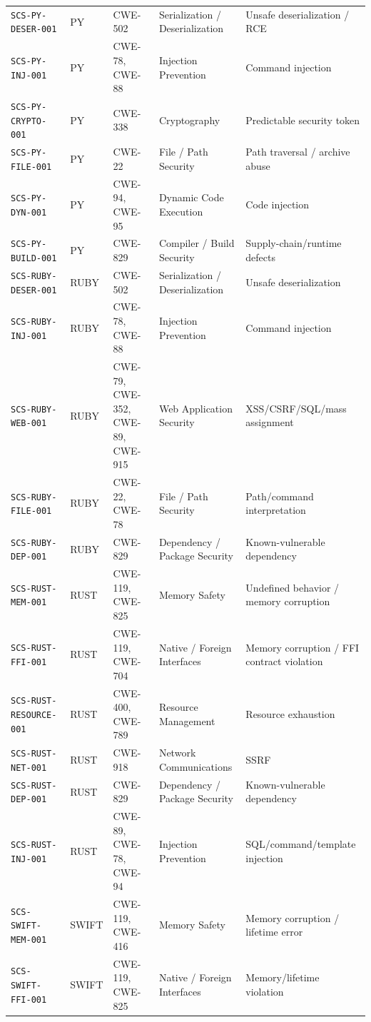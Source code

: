 \documentclass[10pt,letterpaper]{article}
\newcommand{\code}[1]{\begingroup\small\ttfamily\def\UrlFont{\ttfamily}\nolinkurl{#1}\endgroup}
\begin{document}
\begin{landscape}
\begin{longtable}{@{}P{1.3in}P{0.7in}P{1.4in}P{1.8in}P{3.8in}@{}}
\code{SCS-PY-DESER-001} & PY & CWE-502 & Serialization / Deserialization & Unsafe deserialization / RCE\\
\code{SCS-PY-INJ-001} & PY & CWE-78, CWE-88 & Injection Prevention & Command injection\\
\code{SCS-PY-CRYPTO-001} & PY & CWE-338 & Cryptography & Predictable security token\\
\code{SCS-PY-FILE-001} & PY & CWE-22 & File / Path Security & Path traversal / archive abuse\\
\code{SCS-PY-DYN-001} & PY & CWE-94, CWE-95 & Dynamic Code Execution & Code injection\\
\code{SCS-PY-BUILD-001} & PY & CWE-829 & Compiler / Build Security & Supply-chain/runtime defects\\
\code{SCS-RUBY-DESER-001} & RUBY & CWE-502 & Serialization / Deserialization & Unsafe deserialization\\
\code{SCS-RUBY-INJ-001} & RUBY & CWE-78, CWE-88 & Injection Prevention & Command injection\\
\code{SCS-RUBY-WEB-001} & RUBY & CWE-79, CWE-352, CWE-89, CWE-915 & Web Application Security & XSS/CSRF/SQL/mass assignment\\
\code{SCS-RUBY-FILE-001} & RUBY & CWE-22, CWE-78 & File / Path Security & Path/command interpretation\\
\code{SCS-RUBY-DEP-001} & RUBY & CWE-829 & Dependency / Package Security & Known-vulnerable dependency\\
\code{SCS-RUST-MEM-001} & RUST & CWE-119, CWE-825 & Memory Safety & Undefined behavior / memory corruption\\
\code{SCS-RUST-FFI-001} & RUST & CWE-119, CWE-704 & Native / Foreign Interfaces & Memory corruption / FFI contract violation\\
\code{SCS-RUST-RESOURCE-001} & RUST & CWE-400, CWE-789 & Resource Management & Resource exhaustion\\
\code{SCS-RUST-NET-001} & RUST & CWE-918 & Network Communications & SSRF\\
\code{SCS-RUST-DEP-001} & RUST & CWE-829 & Dependency / Package Security & Known-vulnerable dependency\\
\code{SCS-RUST-INJ-001} & RUST & CWE-89, CWE-78, CWE-94 & Injection Prevention & SQL/command/template injection\\
\code{SCS-SWIFT-MEM-001} & SWIFT & CWE-119, CWE-416 & Memory Safety & Memory corruption / lifetime error\\
\code{SCS-SWIFT-FFI-001} & SWIFT & CWE-119, CWE-825 & Native / Foreign Interfaces & Memory/lifetime violation\\

\end{longtable}
\end{landscape}
\end{document}
